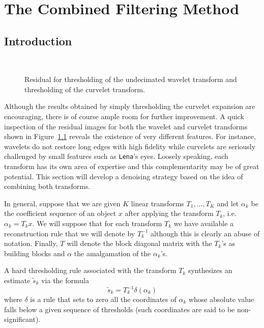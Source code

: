 \chapter{The Combined Filtering Method}
\section{Introduction}
\label{sect_comb}

\begin{figure}[htb]
\centerline{
\hbox{
}}
\caption{Residual for thresholding of the undecimated
wavelet transform and thresholding of 
the curvelet transform.}
\label{fig_lenna_resi}
\end{figure}

Although the results obtained by simply thresholding the curvelet expansion
are encouraging, there is of course ample room for further
improvement. A quick inspection of the residual images for both the
wavelet and curvelet transforms shown in Figure~\ref{fig_lenna_resi}
reveals the existence of very different features.  For instance,
wavelets do not restore long edges with high fidelity while curvelets
are seriously challenged by small features such as {\tt Lena}'s eyes. Loosely
speaking, each transform has its own area of expertise and this
complementarity may be of great potential. This section will develop a
denoising strategy based on the idea of combining both transforms.

In general, suppose that we are given $K$ linear transforms $T_1,
\ldots, T_K$ and let $\alpha_k$ be the coefficient sequence of an
object $x$ after applying the transform $T_k$, i.e. $\alpha_k = T_k
x$. We will suppose that for each transform $T_k$ we have available a
reconstruction rule that we will denote by $T^{-1}_k$ although this is
clearly an abuse of notation.  Finally, $T$ will denote the block
diagonal matrix with the $T_k$'s as building blocks and $\alpha$ the
amalgamation of the $\alpha_k$'s.

A hard thresholding rule associated with the transform $T_k$ synthesizes 
an estimate $\tilde{s}_k$ via the formula 
\begin{equation}
\label{eq:ht}
\tilde{s}_k = T_k^{-1} \delta(\alpha_k)
\end{equation}
where $\delta$ is a rule that sets to zero all the coordinates of
$\alpha_k$ whose absolute value falls below a given sequence of
thresholds (such coordinates are said to be non-significant).

